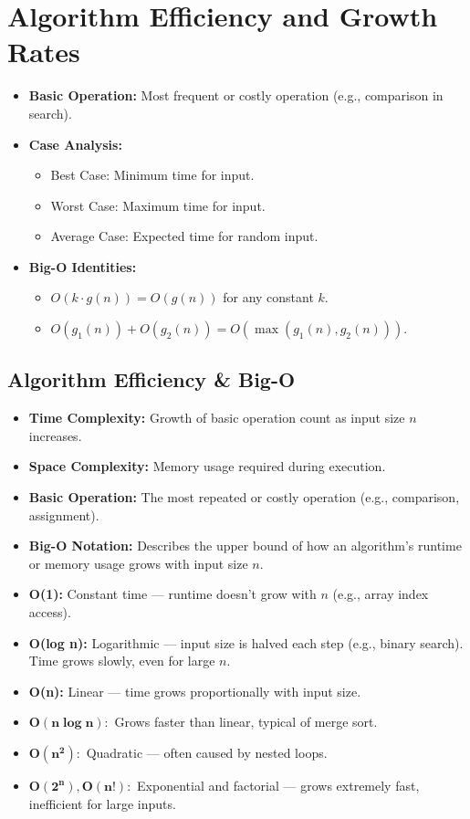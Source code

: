 \documentclass[11pt]{article}
\begin{document}
\hrulefill

\section*{Algorithm Efficiency and Growth Rates}
\begin{itemize}
  \item \textbf{Basic Operation:} Most frequent or costly operation (e.g., comparison in search).
  \item \textbf{Case Analysis:}
  \begin{itemize}
    \item Best Case: Minimum time for input.
    \item Worst Case: Maximum time for input.
    \item Average Case: Expected time for random input.
  \end{itemize}
  \item \textbf{Big-O Identities:}
    \begin{itemize}
      \item $O(k \cdot g(n)) = O(g(n))$ for any constant $k$.
      \item $O(g_1(n)) + O(g_2(n)) = O(\max(g_1(n), g_2(n)))$.
    \end{itemize}
\end{itemize}


\subsection*{Algorithm Efficiency \& Big-O}
\begin{itemize}[leftmargin=*]
\item \textbf{Time Complexity:} Growth of basic operation count as input size $n$ increases.
\item \textbf{Space Complexity:} Memory usage required during execution.
\item \textbf{Basic Operation:} The most repeated or costly operation (e.g., comparison, assignment).
\item \textbf{Big-O Notation:} Describes the upper bound of how an algorithm's runtime or memory usage grows with input size $n$.
\item \textbf{O(1):} Constant time — runtime doesn't grow with $n$ (e.g., array index access).
\item \textbf{O(log n):} Logarithmic — input size is halved each step (e.g., binary search). Time grows slowly, even for large $n$.
\item \textbf{O(n):} Linear — time grows proportionally with input size.
\item $\bm{O(n\log n):}$ Grows faster than linear, typical of merge sort.
\item $\bm{O(n^2):}$ Quadratic — often caused by nested loops.
\item $\bm{O(2^n), O(n!):}$ Exponential and factorial — grows extremely fast, inefficient for large inputs.
\end{itemize}
\end{document}
